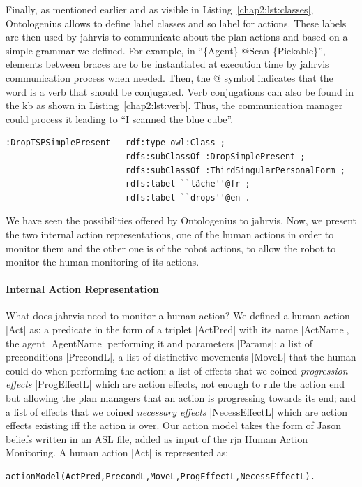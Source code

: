 \documentclass[a4paper,11pt,twoside]{StyleThese}
\begin{document}
Finally, as mentioned earlier and as visible in Listing~\ref{chap2:lst:classes}, Ontologenius allows to define label classes and so label for actions. These labels are then used by \acrshort{jahrvis} to communicate about the plan actions and based on a simple grammar we defined. For example, in ``\{Agent\} @Scan \{Pickable\}'', elements between braces are to be instantiated at execution time by \acrshort{jahrvis} communication process when needed. Then, the @ symbol indicates that the word is a verb that should be conjugated. Verb conjugations can also be found in the \acrshort{kb} as shown in Listing~\ref{chap2:lst:verb}. Thus, the communication manager could process it leading to ``I scanned the blue cube''.

\begin{lstlisting}[style=OwlTurtle, label={chap2:lst:verb}, caption={Description of the class describing the verb Drop in the third-person present-tense, in the OWL language using the Turle syntax.} ]
:DropTSPSimplePresent	rdf:type owl:Class ;
						rdfs:subClassOf :DropSimplePresent ;
						rdfs:subClassOf :ThirdSingularPersonalForm ;
						rdfs:label ``lâche''@fr ;
						rdfs:label ``drops''@en .
\end{lstlisting}

We have seen the possibilities offered by Ontologenius to \acrshort{jahrvis}. Now, we present the two internal action representations, one of the human actions in order to monitor them and the other one is of the robot actions, to allow the robot to monitor the human monitoring of its actions. 

\paragraph{Internal Action Representation}\label{chap2:par:act_rep}
What does \acrshort{jahrvis} need to monitor a human action? We defined a human action |Act| as: a predicate in the form of a triplet |ActPred| with its name |ActName|, the agent |AgentName| performing it and parameters |Params|; a list of preconditions |PrecondL|, a list of distinctive movements |MoveL| that the human could do when performing the action; a list of effects that we coined \textit{progression effects} |ProgEffectL| which are action effects, not enough to rule the action end but allowing the plan managers that an action is progressing towards its end; and a list of effects that we coined \textit{necessary effects} |NecessEffectL| which are action effects existing iff the action is over. Our action model takes the form of Jason beliefs written in an ASL file, added as input of the \acrshort{rja} Human Action Monitoring. A human action |Act| is represented as:
\begin{lstlisting}[style=aslDef]
actionModel(ActPred,PrecondL,MoveL,ProgEffectL,NecessEffectL).
\end{lstlisting}
\end{document}
